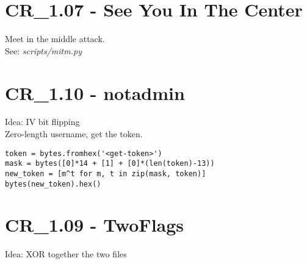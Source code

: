\section{CR_1.07 - See You In The Center}
Meet in the middle attack. \\
See: \textit{scripts/mitm.py}

\section{CR_1.10 - notadmin}
Idea: IV bit flipping \\

Zero-length username, get the token.
\begin{verbatim}
token = bytes.fromhex('<get-token>')
mask = bytes([0]*14 + [1] + [0]*(len(token)-13))
new_token = [m^t for m, t in zip(mask, token)]
bytes(new_token).hex()
\end{verbatim}

\section{CR_1.09 - TwoFlags}
Idea: XOR together the two files
